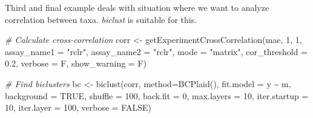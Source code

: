 \documentclass[
]{book}
\newenvironment{Shaded}{\begin{snugshade}}{\end{snugshade}}
\newcommand{\AttributeTok}[1]{\textcolor[rgb]{0.77,0.63,0.00}{#1}}
\newcommand{\CommentTok}[1]{\textcolor[rgb]{0.56,0.35,0.01}{\textit{#1}}}
\newcommand{\ConstantTok}[1]{\textcolor[rgb]{0.00,0.00,0.00}{#1}}
\newcommand{\DecValTok}[1]{\textcolor[rgb]{0.00,0.00,0.81}{#1}}
\newcommand{\FloatTok}[1]{\textcolor[rgb]{0.00,0.00,0.81}{#1}}
\newcommand{\FunctionTok}[1]{\textcolor[rgb]{0.00,0.00,0.00}{#1}}
\newcommand{\NormalTok}[1]{#1}
\newcommand{\OtherTok}[1]{\textcolor[rgb]{0.56,0.35,0.01}{#1}}
\newcommand{\SpecialCharTok}[1]{\textcolor[rgb]{0.00,0.00,0.00}{#1}}
\newcommand{\StringTok}[1]{\textcolor[rgb]{0.31,0.60,0.02}{#1}}
\begin{document}
Third and final example deals with situation where we want to analyze
correlation between taxa. \emph{biclust} is suitable for this.

\begin{Shaded}
\begin{Highlighting}[]
\CommentTok{\# Calculate cross{-}correlation}
\NormalTok{corr }\OtherTok{\textless{}{-}} \FunctionTok{getExperimentCrossCorrelation}\NormalTok{(mae, }\DecValTok{1}\NormalTok{, }\DecValTok{1}\NormalTok{, }
                                      \AttributeTok{assay\_name1 =} \StringTok{"rclr"}\NormalTok{, }\AttributeTok{assay\_name2 =} \StringTok{"rclr"}\NormalTok{, }
                                      \AttributeTok{mode =} \StringTok{"matrix"}\NormalTok{,}
                                      \AttributeTok{cor\_threshold =} \FloatTok{0.2}\NormalTok{, }\AttributeTok{verbose =}\NormalTok{ F, }\AttributeTok{show\_warning =}\NormalTok{ F)}

\CommentTok{\# Find biclusters}
\NormalTok{bc }\OtherTok{\textless{}{-}} \FunctionTok{biclust}\NormalTok{(corr, }\AttributeTok{method=}\FunctionTok{BCPlaid}\NormalTok{(), }\AttributeTok{fit.model =}\NormalTok{ y }\SpecialCharTok{\textasciitilde{}}\NormalTok{ m,}
              \AttributeTok{background =} \ConstantTok{TRUE}\NormalTok{, }\AttributeTok{shuffle =} \DecValTok{100}\NormalTok{, }\AttributeTok{back.fit =} \DecValTok{0}\NormalTok{, }\AttributeTok{max.layers =} \DecValTok{10}\NormalTok{,}
              \AttributeTok{iter.startup =} \DecValTok{10}\NormalTok{, }\AttributeTok{iter.layer =} \DecValTok{100}\NormalTok{, }\AttributeTok{verbose =} \ConstantTok{FALSE}\NormalTok{)}
\end{Highlighting}
\end{Shaded}

\begin{Shaded}
\end{Shaded}
\end{document}
